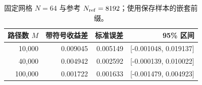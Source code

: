 \begin{table}[H]\centering\small
\caption{固定网格 $N=64$ 与参考 $N_{\rm ref}=8192$；使用保存样本的嵌套前缀。}\label{tab:sample-size}
\begin{tabular}{rrrr}\toprule
路径数 $M$ & 带符号收益差 & 标准误差 & 95\% 区间\\\midrule
10,000 & 0.009045 & 0.005149 & [-0.001048, 0.019137]\\
40,000 & 0.004942 & 0.002592 & [-0.000139, 0.010022]\\
100,000 & 0.001722 & 0.001633 & [-0.001479, 0.004923]\\
\bottomrule\end{tabular}
\end{table}
